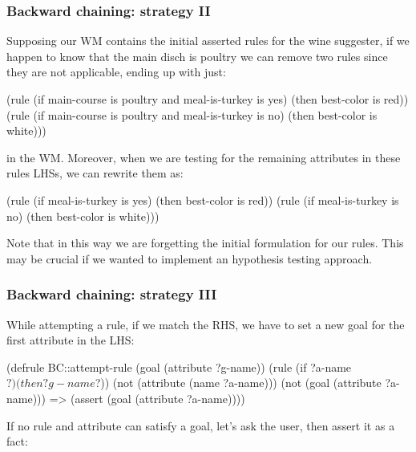 \documentclass[xcolor={usenames,dvipsnames,svgnames}, compress]{beamer}
\begin{document}
\begin{frame}[fragile]
  \frametitle{Backward chaining: strategy II}
  Supposing our WM contains the initial asserted rules for the wine
  suggester, if we happen to know that the main disch is
  \textsf{poultry} we can remove two rules since they are not
  applicable, ending up with just:
  \begin{clips-code}[numbers=none]
    (rule (if main-course is poultry and meal-is-turkey is yes)
          (then best-color is red))
    (rule (if main-course is poultry and meal-is-turkey is no)
          (then best-color is white)))
  \end{clips-code}
  in the WM. Moreover, when we are testing for the remaining attributes
  in these rules LHSs, we can rewrite them as:
  \begin{clips-code}[numbers=none]
    (rule (if meal-is-turkey is yes)
          (then best-color is red))
    (rule (if meal-is-turkey is no)
          (then best-color is white)))
  \end{clips-code}
  Note that in this way we are forgetting the initial formulation for
  our rules. This may be crucial if we wanted to implement an
  hypothesis testing approach.      
\end{frame}

\begin{frame}[fragile]
  \frametitle{Backward chaining: strategy III}
  While attempting a rule, if we match the RHS, we have to set a new
  goal for the first attribute in the LHS:
  \begin{clips-code}[numbers=none]
    (defrule BC::attempt-rule
        (goal (attribute ?g-name))
        (rule (if ?a-name $?) (then ?g-name $?))
        (not (attribute (name ?a-name)))
        (not (goal (attribute ?a-name)))
        =>
        (assert (goal (attribute ?a-name))))
  \end{clips-code}

  If no rule and attribute can satisfy a goal, let's ask the user,
  then assert it as a fact:    
\end{frame}
\end{document}

